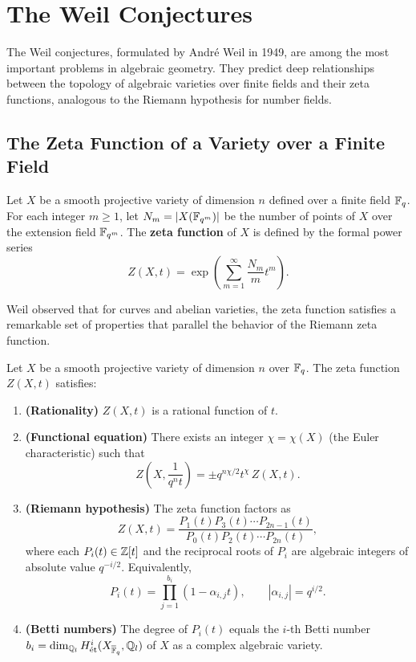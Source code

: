 \section{The Weil Conjectures}

The Weil conjectures, formulated by Andr\'e Weil in 1949, are among the most important problems in algebraic geometry. They predict deep relationships between the topology of algebraic varieties over finite fields and their zeta functions, analogous to the Riemann hypothesis for number fields.

\subsection{The Zeta Function of a Variety over a Finite Field}

Let \(X\) be a smooth projective variety of dimension \(n\) defined over a finite field \(\mathbb{F}_q\). For each integer \(m \geq 1\), let \(N_m = |X(\mathbb{F}_{q^m})|\) be the number of points of \(X\) over the extension field \(\mathbb{F}_{q^m}\). The \textbf{zeta function} of \(X\) is defined by the formal power series
\[
Z(X, t) = \exp\!\left( \sum_{m=1}^\infty \frac{N_m}{m} t^m \right).
\]

Weil observed that for curves and abelian varieties, the zeta function satisfies a remarkable set of properties that parallel the behavior of the Riemann zeta function.

\begin{theorem}
Let \(X\) be a smooth projective variety of dimension \(n\) over \(\mathbb{F}_q\). The zeta function \(Z(X, t)\) satisfies:
\begin{enumerate}
    \item \textbf{(Rationality)} \(Z(X, t)\) is a rational function of \(t\).
    \item \textbf{(Functional equation)} There exists an integer \(\chi = \chi(X)\) (the Euler characteristic) such that
    \[
    Z\!\left( X, \frac{1}{q^n t} \right) = \pm q^{n\chi/2} t^\chi \, Z(X, t).
    \]
    \item \textbf{(Riemann hypothesis)} The zeta function factors as
    \[
    Z(X, t) = \frac{P_1(t) P_3(t) \cdots P_{2n-1}(t)}{P_0(t) P_2(t) \cdots P_{2n}(t)},
    \]
    where each \(P_i(t) \in \mathbb{Z}[t]\) and the reciprocal roots of \(P_i\) are algebraic integers of absolute value \(q^{-i/2}\). Equivalently,
    \[
    P_i(t) = \prod_{j=1}^{b_i} (1 - \alpha_{i,j} t), \qquad |\alpha_{i,j}| = q^{i/2}.
    \]
    \item \textbf{(Betti numbers)} The degree of \(P_i(t)\) equals the \(i\)-th Betti number \(b_i = \dim_{\mathbb{Q}_l} H^i_{\text{\'et}}(X_{\overline{\mathbb{F}}_q}, \mathbb{Q}_l)\) of \(X\) as a complex algebraic variety.
\end{enumerate}
\end{theorem}

